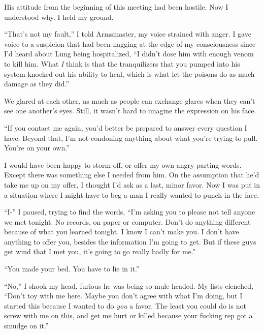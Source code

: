 His attitude from the beginning of this meeting had been hostile.  Now I understood why.  I held my ground.



``That's not my fault,'' I told Armsmaster, my voice strained with anger.  I gave voice to a suspicion that had been nagging at the edge of my consciousness since I'd heard about Lung being hospitalized, ``I didn't dose him with enough venom to kill him.  What \emph{I} think is that the tranquilizers that you pumped into his system knocked out his ability to heal, which is what let the poisons do as much damage as they did.''



We glared at each other, as much as people can exchange glares when they can't see one another's eyes.  Still, it wasn't hard to imagine the expression on his face.



``If you contact me again, you'd better be prepared to answer every question I have.  Beyond that, I'm not condoning anything about what you're trying to pull.  You're on your own.''



I would have been happy to storm off, or offer my own angry parting words.  Except there was something else I needed from him.  On the assumption that he'd take me up on my offer, I thought I'd ask as a last, minor favor.  Now I was put in a situation where I might have to beg a man I really wanted to punch in the face.



``I-'' I paused, trying to find the words, ``I'm asking you to please not tell anyone we met tonight.  No records, on paper or computer.  Don't do anything different because of what you learned tonight.  I know I can't make you.  I don't have anything to offer you, besides the information I'm going to get.  But if these guys get wind that I met you, it's going to go really badly for me.''



``You made your bed.  You have to lie in it.''



``No,'' I shook my head, furious he was being so mule headed.  My fists clenched, ``Don't toy with me here.  Maybe you don't agree with what I'm doing, but I started this because I wanted to do \emph{you} a favor.  The least you could do is not screw with me on this, and get me hurt or killed because your fucking rep got a smudge on it.''



